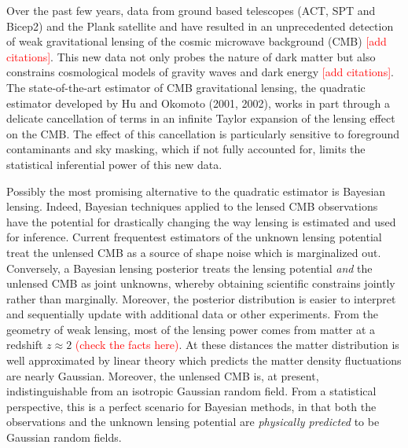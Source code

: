 \documentclass[noinfoline]{imsart}
\begin{document}
 Over the past few years, data from ground based telescopes (ACT, SPT and Bicep2) and the Plank satellite and have resulted in an unprecedented detection of weak gravitational lensing of the cosmic microwave background (CMB) \textcolor{red}{[add citations]}.  This new data not only probes the nature of dark matter but also constrains cosmological models of gravity waves and dark energy \textcolor{red}{[add citations]}. The state-of-the-art estimator of CMB gravitational lensing, the quadratic estimator developed by Hu and Okomoto (2001, 2002), works in part through a delicate cancellation of terms in an infinite Taylor expansion of the lensing effect on the CMB. The effect of this cancellation is particularly sensitive to foreground contaminants and sky masking, which  if not fully accounted for,  limits  the statistical inferential power of this new data.  

 Possibly the most promising alternative to the quadratic estimator is Bayesian lensing. Indeed, Bayesian techniques applied to the lensed CMB observations have the potential for drastically changing the way lensing is estimated and used for inference.  Current frequentest estimators of the unknown lensing potential treat the unlensed CMB as a source of shape noise which is marginalized out. Conversely, a Bayesian lensing posterior treats the lensing potential {\em and} the unlensed CMB as joint unknowns, whereby obtaining scientific constrains jointly rather than marginally. Moreover, the  posterior distribution is easier to interpret and sequentially update with additional data or other experiments. From the geometry of weak lensing, most of the lensing power comes from matter at a redshift $z\approx 2$ \textcolor{red}{(check the facts here)}. At these distances the matter distribution is well approximated by linear theory which predicts the matter density fluctuations are nearly Gaussian. Moreover, the unlensed CMB is, at present, indistinguishable from an isotropic Gaussian random field.  From a statistical perspective, this is a perfect scenario for Bayesian methods, in that both the observations and the unknown lensing potential are {\em physically predicted} to be Gaussian random fields.  
 
\end{document}
